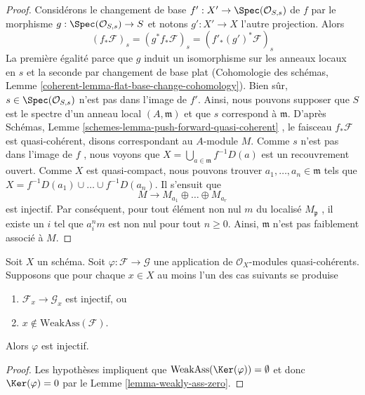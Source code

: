 \begin{proof}
Considérons le changement de base  $f' : X' \to \Spec(\mathcal{O}_{S, s})$  de  $f$  par le morphisme
 $g : \Spec(\mathcal{O}_{S, s}) \to S$  et notons  $g' : X' \to X$  l'autre projection. Alors
$$
(f_*\mathcal{F})_s = (g^*f_*\mathcal{F})_s = (f'_*(g')^*\mathcal{F})_s
$$
La première égalité parce que  $g$  induit un isomorphisme sur les anneaux
locaux en  $s$  et la seconde par changement de base plat (Cohomologie des
schémas, Lemme  \ref{coherent-lemma-flat-base-change-cohomology}). Bien sûr,  $s \in \Spec(\mathcal{O}_{S, s})$  n'est pas dans l'image de
 $f'$. Ainsi, nous pouvons supposer que  $S$  est le spectre d'un
anneau local  $(A, \mathfrak m)$  et que  $s$  correspond à  $\mathfrak m$. D'après
Schémas, Lemme  \ref{schemes-lemma-push-forward-quasi-coherent} , le faisceau  $f_*\mathcal{F}$  est quasi-cohérent, disons
correspondant au  $A$-module  $M$. Comme  $s$  n'est pas
dans l'image de  $f$ , nous voyons que  $X = \bigcup_{a \in \mathfrak m} f^{-1}D(a)$  est un recouvrement
ouvert. Comme  $X$  est quasi-compact, nous pouvons trouver  $a_1, \ldots, a_n \in \mathfrak m$ 
tels que  $X = f^{-1}D(a_1) \cup \ldots \cup f^{-1}D(a_n)$. Il s'ensuit que
$$
M \to M_{a_1} \oplus \ldots \oplus M_{a_r}
$$
est injectif. Par conséquent, pour tout élément non nul  $m$  du localisé
 $M_\mathfrak p$ , il existe un  $i$  tel que  $a_i^n m$  est non nul pour tout
 $n \geq 0$. Ainsi,  $\mathfrak m$  n'est pas faiblement associé à  $M$.
\end{proof}

\begin{lemma}
\label{lemma-check-injective-on-weakass}
Soit  $X$  un schéma. Soit  $\varphi : \mathcal{F} \to \mathcal{G}$  une application de
 $\mathcal{O}_X$-modules quasi-cohérents. Supposons que pour chaque  $x \in X$  au
moins l'un des cas suivants se produise
\begin{enumerate}
\item $\mathcal{F}_x \to \mathcal{G}_x$  est injectif, ou
\item $x \not \in \text{WeakAss}(\mathcal{F})$.
\end{enumerate}
Alors  $\varphi$  est injectif.
\end{lemma}

\begin{proof}
Les hypothèses impliquent que  $\text{WeakAss}(\Ker(\varphi)) = \emptyset$  et donc  $\Ker(\varphi) = 0$  par le Lemme
 \ref{lemma-weakly-ass-zero}.
\end{proof}

